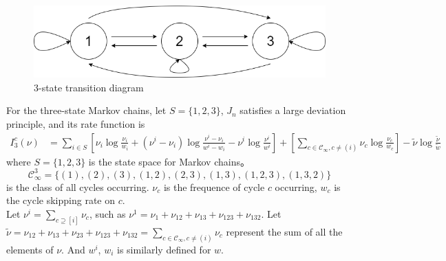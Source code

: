 \documentclass[11pt,en,cite=authoryear]{elegantpaper}
\begin{document}
\begin{theorem}
    \begin{figure}[h]
        \centering
        \includegraphics[scale=0.3]{chart/3-state.png}
        \caption{3-state transition diagram}
    \end{figure}

For the three-state Markov chains, let $S = \{1, 2, 3\}$, $J_{n}$ satisfies a large deviation principle, and its rate function is
\begin{align*}
    I_3^c(\nu) &=
    \sum_{i\in S} \left[\nu_{i}\log \frac{\nu_{i}}{w_i} + (\nu^i - \nu_i)\log \frac{\nu^i - \nu_i}{w^i - w_i} 
    - \nu^i \log \frac{\nu^i}{w^i} \right]
    + \left[\sum_{c \in \mathcal{C}_{\infty}, c\neq (i)} \nu_{c} \log \frac{\nu_{c}}{w_c} \right]
    -\tilde{\nu}\log \frac{\tilde{\nu} }{\tilde{w} }
\end{align*}
where $S=\{1, 2, 3\}$ is the state space for Markov chains。
$$\mathcal{C}_{\infty}^3 = \{(1), (2), (3), (1,2), (2,3), (1,3), (1,2,3), (1,3,2)\}$$
is the class of all cycles occurring.
$\nu_c$ is the frequence of cycle $c$ occurring, $w_c$ is the cycle skipping rate on $c$.\\
Let $\nu^{i} = \sum_{c \supseteq [i]} \nu_{c}$, such as $\nu^{1} = \nu_{1} + \nu_{12} + \nu_{13} + \nu_{123} +\nu_{132}$.
Let  $\tilde{\nu} = \nu_{12} + \nu_{13} + \nu_{23} + \nu_{123} +\nu_{132}=\sum_{c \in \mathcal{C}_{\infty}, c\neq (i)} \nu_{c}$ represent the sum of all the elements of $\nu$. 
And $w^i$, $w_i$ is similarly defined for $w$.
\end{theorem}
\end{document}
